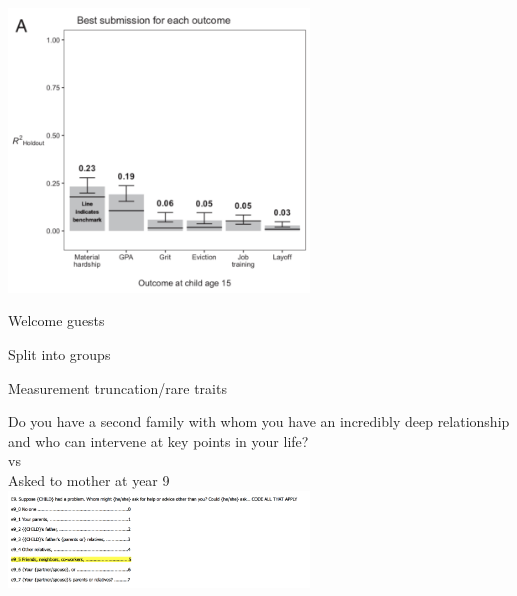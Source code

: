 \documentclass[aspectratio=169]{beamer}
\begin{document}
\begin{frame}

\begin{center}
\includegraphics[width = 0.6\textwidth]{figures/salganik_measuring_2020_fig2a}
\end{center}

\end{frame}
\begin{frame}

\begin{center}
{\Large Welcome guests}
\end{center}

\end{frame}
\begin{frame}

\begin{center}
{\Large Split into groups}
\end{center}

\end{frame}
\begin{frame}

\begin{center}
{\Large Measurement truncation/rare traits}
\end{center}

\end{frame}
\begin{frame}

Do you have a second family with whom you have an incredibly deep relationship and who can intervene at key points in your life?\\

vs\\

Asked to mother at year 9\\ 

\includegraphics[width = 0.6\textwidth]{figures/y9_other_adults}

\end{frame}
\end{document}
